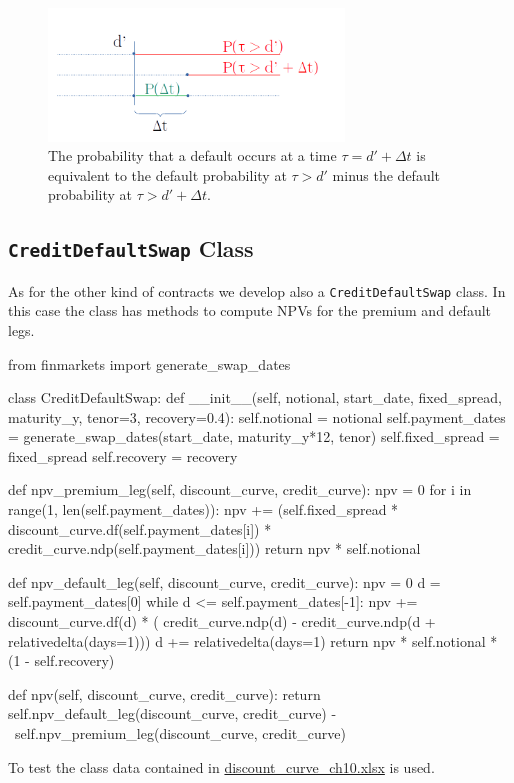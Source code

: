 \begin{figure}[htb]
	\centering
	\includegraphics[width=0.7\textwidth]{figures/timeline.png}
	\caption{The probability that a default occurs at a time $\tau = d'+\Delta t$ is equivalent to the default probability at $\tau > d'$ minus the default probability at $\tau>d'+\Delta t$.}
	\label{fig:default_p}
\end{figure}

\subsection{\texttt{CreditDefaultSwap} Class}

As for the other kind of contracts we develop also a \texttt{CreditDefaultSwap} class. In this case the class has methods to compute NPVs for the premium and default legs.

\begin{ipython}
from finmarkets import generate_swap_dates

class CreditDefaultSwap:
    def __init__(self, notional, start_date, fixed_spread,
                 maturity_y, tenor=3, recovery=0.4):
        self.notional = notional
        self.payment_dates = generate_swap_dates(start_date,
                                                 maturity_y*12, tenor)
        self.fixed_spread = fixed_spread
        self.recovery = recovery

    def npv_premium_leg(self, discount_curve, credit_curve):
        npv = 0
        for i in range(1, len(self.payment_dates)):
            npv += (self.fixed_spread *
                    discount_curve.df(self.payment_dates[i]) *
                    credit_curve.ndp(self.payment_dates[i]))
        return npv * self.notional

    def npv_default_leg(self, discount_curve, credit_curve):
        npv = 0
        d = self.payment_dates[0]
        while d <= self.payment_dates[-1]:
            npv += discount_curve.df(d) * (
                   credit_curve.ndp(d) -
                   credit_curve.ndp(d + relativedelta(days=1)))
            d += relativedelta(days=1)
        return npv * self.notional * (1 - self.recovery)

    def npv(self, discount_curve, credit_curve):
        return self.npv_default_leg(discount_curve, credit_curve) - \
               self.npv_premium_leg(discount_curve, credit_curve)
\end{ipython}
\noindent
To test the class data contained in \href{https://github.com/matteosan1/finance_course/raw/develop/libro/input_files/discount_curve_ch_10.xlsx}{discount\_curve\_ch10.xlsx} is used.

